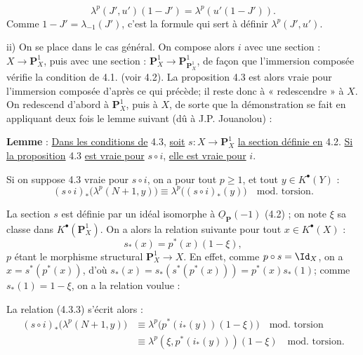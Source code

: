 
\[
  \lambda^p(J',u')(1-J')=\lambda^p(u'(1-J')).
\]
Comme \(1-J'=\lambda_{-1}(J')\), c'est la formule qui sert à définir \(\lambda^p(J',u')\).

ii) On se place dans le cas général. On compose alors \(i\) avec une section : \(X\to\mathbf P_X^1\), puis avec une section : \(\mathbf P_X^1\to\mathbf P_{\mathbf P_X^1}^1\), de façon que l'immersion composée vérifie la condition de 4.1. (voir 4.2). La proposition 4.3 est alors vraie pour l'immersion composée d'après ce qui précède; il reste donc à « redescendre » à \(X\). On redescend d'abord à \(\mathbf P_X^1\), puis à \(X\), de sorte que la démonstration se fait en appliquant deux fois le lemme suivant (dû à J.P. Jouanolou) :

\textbf{Lemme} : \uline{Dans les conditions de} 4.3, \uline{soit} \(s:X\to\mathbf P_X^1\) \uline{la section définie en} 4.2. \uline{Si la proposition} 4.3 \uline{est vraie pour} \(s\circ i\), \uline{elle est vraie pour} \(i\).

Si on suppose 4.3 vraie pour \(s\circ i\), on a pour tout \(p\ge1\), et tout \(y\in K^{\bullet}(Y)\) :
\begin{equation}\tag{4.3.3}
 (s\circ i)_*\bigl(\lambda^p(N+1,y)\bigr)
 \equiv
 \lambda^p\bigl((s\circ i)_*(y)\bigr)
 \quad\text{mod.\ torsion}.
\end{equation}

La section \(s\) est définie par un idéal isomorphe à \(\underline{O}_{\mathbf P}(-1)\) (4.2) ; on note \(\xi\) sa classe dans \(K^{\bullet}(\mathbf P_X^1)\). On a alors la relation suivante pour tout \(x\in K^{\bullet}(X)\) :
\[
  s_*(x)=p^*(x)(1-\xi),
\]
\(p\) étant le morphisme structural \(\mathbf P_X^1\to X\). En effet, comme \(p\circ s=\Id_X\), on a \(x=s^*(p^*(x))\), d'où \(s_*(x)=s_*(s^*(p^*(x)))=p^*(x)s_*(1)\); comme \(s_*(1)=1-\xi\), on a la relation voulue :

La relation (4.3.3) s'écrit alors :
\[
\begin{aligned}
(s\circ i)_*\bigl(\lambda^p(N+1,y)\bigr)
&\equiv \lambda^p\bigl(p^*(i_*(y))(1-\xi)\bigr)\quad\text{mod.\ torsion}\\
&\equiv \lambda^p(\xi,p^*(i_*(y)))(1-\xi)\quad\text{mod.\ torsion}.
\end{aligned}
\]
